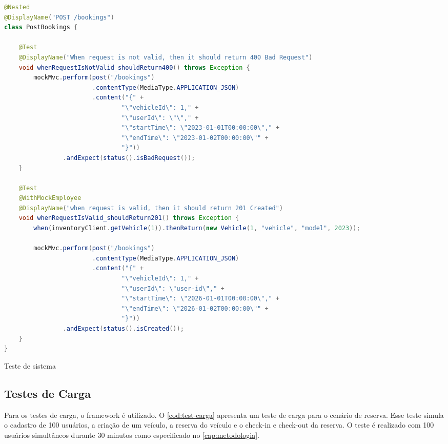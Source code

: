 \begin{codigo}[H]
    \begin{lstlisting}[language=Java]
@Nested
@DisplayName("POST /bookings")
class PostBookings {

    @Test
    @DisplayName("When request is not valid, then it should return 400 Bad Request")
    void whenRequestIsNotValid_shouldReturn400() throws Exception {
        mockMvc.perform(post("/bookings")
                        .contentType(MediaType.APPLICATION_JSON)
                        .content("{" +
                                "\"vehicleId\": 1," +
                                "\"userId\": \"\"," +
                                "\"startTime\": \"2023-01-01T00:00:00\"," +
                                "\"endTime\": \"2023-01-02T00:00:00\"" +
                                "}"))
                .andExpect(status().isBadRequest());
    }

    @Test
    @WithMockEmployee
    @DisplayName("when request is valid, then it should return 201 Created")
    void whenRequestIsValid_shouldReturn201() throws Exception {
        when(inventoryClient.getVehicle(1)).thenReturn(new Vehicle(1, "vehicle", "model", 2023));

        mockMvc.perform(post("/bookings")
                        .contentType(MediaType.APPLICATION_JSON)
                        .content("{" +
                                "\"vehicleId\": 1," +
                                "\"userId\": \"user-id\"," +
                                "\"startTime\": \"2026-01-01T00:00:00\"," +
                                "\"endTime\": \"2026-01-02T00:00:00\"" +
                                "}"))
                .andExpect(status().isCreated());
    }
}
    \end{lstlisting}
    \caption{Teste de sistema}
    \label{cod:test-sistema}
\end{codigo}

\subsection{Testes de Carga}
Para os testes de carga, o framework  é utilizado. O \autoref{cod:test-carga} apresenta um teste de carga para o cenário de reserva. Esse teste simula o cadastro de 100 usuários, a criação de um veículo, a reserva do veículo e o check-in e check-out da reserva. O teste é realizado com 100 usuários simultâneos durante 30 minutos como especificado no \autoref{cap:metodologia}.

